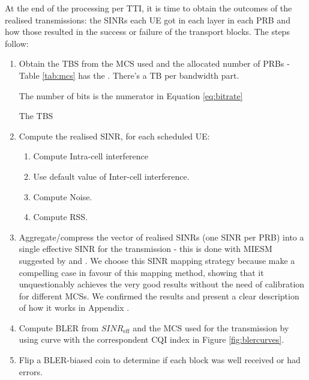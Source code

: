 At the end of the processing per TTI, it is time to obtain the outcomes of the realised transmissions: the SINRs each UE got in each layer in each PRB and how those resulted in the success or failure of the transport blocks. The steps follow:
\begin{enumerate}
    \item Obtain the \ac{TBS} from the \ac{MCS} used and the allocated number of \acsp{PRB} - Table \ref{tab:mcs} has the . There's a \acs{TB} per bandwidth part. 
    
    The number of bits is the numerator in Equation \eqref{eq:bitrate}

    The \ac{TBS}
    
    \item Compute the realised SINR, for each scheduled \acs{UE}:
    \begin{enumerate}
        \item Compute Intra-cell interference
        \item Use default value of Inter-cell interference.
        \item Compute Noise.
        \item Compute RSS.
    \end{enumerate}


    \item Aggregate/compress the vector of realised SINRs (one SINR per PRB) into a single effective SINR for the transmission - this is done with \ac{MIESM} suggested by \cite{1696622} and \cite{1656798}. We choose this SINR mapping strategy because \cite{1656798, 4657235, 5982870, 6008103, miesm1} make a compelling case in favour of this mapping method, showing that it unquestionably achieves the very good results without the need of calibration for different MCSs. We confirmed the results and present a clear description of how it works in Appendix \cite{ap:c}. 
    

    \item Compute \ac{BLER} from $SINR_\text{eff}$ and the MCS used for the transmission by using curve with the correspondent CQI index in Figure \ref{fig:blercurves}.
    
    \item Flip a \acs{BLER}-biased coin to determine if each block was well received or had errors.
    

\end{enumerate}
